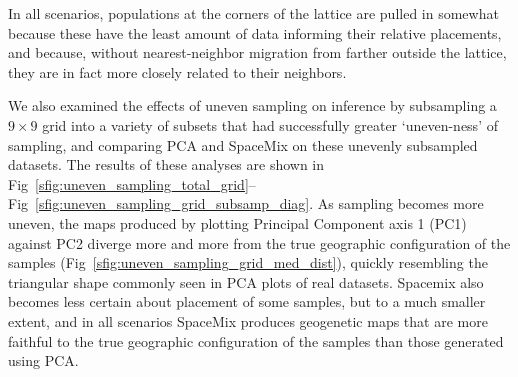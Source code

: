 \documentclass[10pt,letterpaper]{article}
\begin{document}
In all scenarios, populations at the corners of the lattice are pulled in somewhat
because these have the least amount of data informing their relative placements, and because, without nearest-neighbor migration from farther outside the lattice, they are in fact more closely related to their neighbors.  

We also examined the effects of uneven sampling on inference by 
subsampling a $9\times9$ grid into a variety of subsets that had successfully greater `uneven-ness' of sampling,
and comparing PCA and SpaceMix on these unevenly subsampled datasets.
The results of these analyses are shown in Fig\ \ref{sfig:uneven_sampling_total_grid}--Fig\ \ref{sfig:uneven_sampling_grid_subsamp_diag}.  
As sampling becomes more uneven,
the maps produced by plotting Principal Component axis 1 (PC1) against PC2 diverge more and more from 
the true geographic configuration of the samples (Fig\ \ref{sfig:uneven_sampling_grid_med_dist}),
quickly resembling the triangular shape commonly seen in PCA plots of real datasets.
Spacemix also becomes less certain about placement of some samples,
but to a much smaller extent, and in all scenarios SpaceMix produces geogenetic maps that are more 
faithful to the true geographic configuration of the samples than those generated using PCA. 
\end{document}
